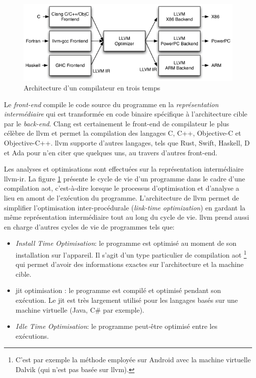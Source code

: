             \begin{figure}[!h]\centering
                \includegraphics[scale=0.6]{ch3-lazart/img/LLVMCompiler.png}
                \caption{Architecture d'un compilateur en trois temps \cite{llvm/TAOSA}}  \label{fig:llvm-arch}
            \end{figure}
            
            Le \textit{front-end} compile le code source du programme en la \textit{représentation intermédiaire} qui est transformée en code binaire spécifique à l'architecture cible par le \textit{back-end}. Clang \cite{llvm} est certainement le front-end de compilateur le plus célèbre de \gls{llvm} et permet la compilation des langages C, C++, Objective-C et Objective-C++. \gls{llvm} supporte d'autres langages, tels que Rust, Swift, Haskell, D et Ada pour n'en citer que quelques uns, au travers d'autres front-end.
            
            Les analyses et optimisations sont effectuées sur la représentation intermédiaire \gls{llvm-ir}. La figure \ref{fig:llvm-arch} présente le cycle de vie d'un programme dans le cadre d'une compilation \gls{aot}, c'est-à-dire lorsque le processus d'optimisation et d'analyse a lieu en amont de l'exécution du programme. L'architecture de \gls{llvm} permet de simplifier l'optimisation inter-procédurale (\textit{link-time optimization}) en gardant la même représentation intermédiaire tout au long du cycle de vie. \gls{llvm} prend aussi en charge d'autres cycles de vie de programmes tels que:
            
            \begin{itemize}
                \item \textit{Install Time Optimisation}: le programme est optimisé au moment de son installation sur l'appareil. Il s'agit d'un type particulier de compilation \gls{aot} \footnote{C'est par exemple la méthode employée sur Android avec la machine virtuelle Dalvik (qui n'est pas basée sur \gls{llvm}).} qui permet d'avoir des informations exactes sur l'architecture et la machine cible.
                \item \gls{jit} optimisation : le programme est compilé et optimisé pendant son exécution. Le \gls{jit} est très largement utilisé pour les langages basés sur une machine virtuelle (Java, C\# par exemple).
                \item \textit{Idle Time Optimisation}: le programme peut-être optimisé entre les exécutions. 
            \end{itemize}            
            
